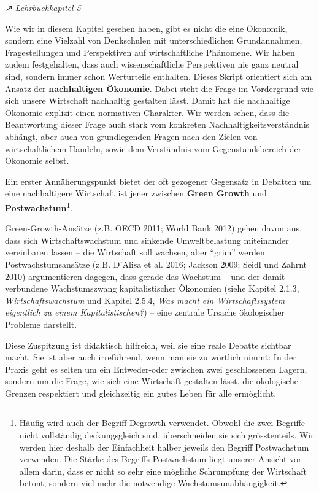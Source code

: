 \documentclass[
  nswissgerman,
  a4paper,
  DIV=11,
  numbers=noendperiod,
  oneside,
  openany]{scrreprt}
\begin{document}
\emph{↗ Lehrbuchkapitel 5}

Wie wir in diesem Kapitel gesehen haben, gibt es nicht die eine
Ökonomik, sondern eine Vielzahl von Denkschulen mit unterschiedlichen
Grundannahmen, Fragestellungen und Perspektiven auf wirtschaftliche
Phänomene. Wir haben zudem festgehalten, dass auch wissenschaftliche
Perspektiven nie ganz neutral sind, sondern immer schon Werturteile
enthalten. Dieses Skript orientiert sich am Ansatz der
\textbf{nachhaltigen Ökonomie}. Dabei steht die Frage im Vordergrund wie
sich unsere Wirtschaft nachhaltig gestalten lässt. Damit hat die
nachhaltige Ökonomie explizit einen normativen Charakter. Wir werden
sehen, dass die Beantwortung dieser Frage auch stark vom konkreten
Nachhaltigkeitsverständnis abhängt, aber auch von grundlegenden Fragen
nach den Zielen von wirtschaftlichem Handeln, sowie dem Verständnis vom
Gegenstandsbereich der Ökonomie selbst.

Ein erster Annäherungspunkt bietet der oft gezogener Gegensatz in
Debatten um eine nachhaltigere Wirtschaft ist jener zwischen
\textbf{Green Growth} und \textbf{Postwachstum}\footnote{Häufig wird
  auch der Begriff Degrowth verwendet. Obwohl die zwei Begriffe nicht
  vollständig deckungsgleich sind, überschneiden sie sich grösstenteils.
  Wir werden hier deshalb der Einfachheit halber jeweils den Begriff
  Postwachstum verwenden. Die Stärke des Begriffs Postwachstum liegt
  unserer Ansicht vor allem darin, dass er nicht so sehr eine mögliche
  Schrumpfung der Wirtschaft betont, sondern viel mehr die notwendige
  Wachstumsunabhängigkeit.}.

Green-Growth-Ansätze (z.B. OECD 2011; World Bank 2012) gehen davon aus,
dass sich Wirtschaftswachstum und sinkende Umweltbelastung miteinander
vereinbaren lassen -- die Wirtschaft soll wachsen, aber ``grün'' werden.
Postwachstumsansätze (z.B. D'Alisa et al. 2016; Jackson 2009; Seidl und
Zahrnt 2010) argumentieren dagegen, dass gerade das Wachstum -- und der
damit verbundene Wachstumszwang kapitalistischer Ökonomien (siehe
Kapitel 2.1.3, \emph{Wirtschaftswachstum} und Kapitel 2.5.4, \emph{Was
macht ein Wirtschaftssystem eigentlich zu einem Kapitalistischen?}) --
eine zentrale Ursache ökologischer Probleme darstellt.

Diese Zuspitzung ist didaktisch hilfreich, weil sie eine reale Debatte
sichtbar macht. Sie ist aber auch irreführend, wenn man sie zu wörtlich
nimmt: In der Praxis geht es selten um ein Entweder-oder zwischen zwei
geschlossenen Lagern, sondern um die Frage, wie sich eine Wirtschaft
gestalten lässt, die ökologische Grenzen respektiert und gleichzeitig
ein gutes Leben für alle ermöglicht.
\end{document}
